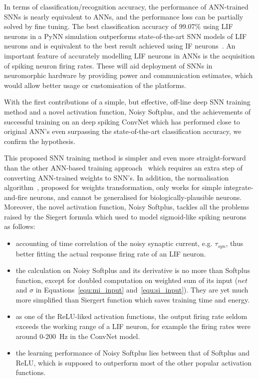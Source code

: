 In terms of classification/recognition accuracy, the performance of ANN-trained SNNs is nearly equivalent to ANNs, and the performance loss can be partially solved by fine tuning.
The best classification accuracy of 99.07\% using LIF neurons in a PyNN simulation outperforms state-of-the-art SNN models of LIF neurons and is equivalent to the best result achieved using IF neurons~\citep{diehl2015fast}.
An important feature of accurately modelling LIF neurons in ANNs is the acquisition of spiking neuron firing rates. These will aid deployment of SNNs in neuromorphic hardware by providing power and communication estimates, which would allow better usage or customisation of the platforms.

With the first contributions of a simple, but effective, off-line deep SNN training method and a novel activation function, Noisy Softplus, and the achievements of successful training on an deep spiking ConvNet which has performed close to original ANN's even surpassing the state-of-the-art classification accuracy, we confirm the hypothesis. 

This proposed SNN training method is simpler and even more straight-forward than the other ANN-based training approach~\citep{cao2015spiking,diehl2015fast} which requires an extra step of converting ANN-trained weights to SNN's.
In addition, the normalisation algorithm~\citep{diehl2015fast}, proposed for weights transformation, only works for simple integrate-and-fire neurons, and cannot be generalised for biologically-plausible neurons.
Moreover, the novel activation function, Noisy Softplus, tackles all the problems raised by the Siegert formula which used to model sigmoid-like spiking neurons~\citep{Jug_etal_2012} as follows: 
	\begin{itemize}
		\item accounting of time correlation of the noisy synaptic current, e.g. $\tau_{syn}$, thus better fitting the actual response firing rate of an LIF neuron. %
		
		
		\item the calculation on Noisy Softplus and its derivative is no more than Softplus function, except for doubled computation on weighted sum of its input ($net$ and $\sigma$ in Equations~\ref{equ:mi_input} and~\ref{equ:si_input}).
		They are yet much more simplified than Siergert function which saves training time and energy.
		
		\item as one of the ReLU-liked activation functions, the output firing rate seldom exceeds the working range of a LIF neuron, for example the firing rates were around 0-200~Hz in the ConvNet model.
		
		\item the learning performance of Noisy Softplus lies between that of Softplus and ReLU, which is supposed to outperform most of the other popular activation functions.
	\end{itemize}

